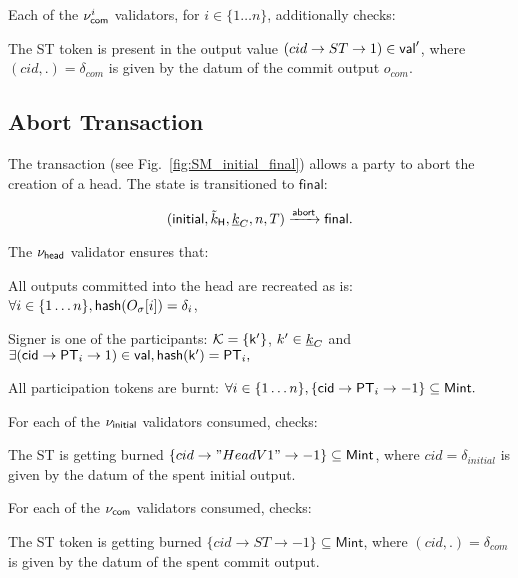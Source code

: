 \noindent Each of the $\nu_\mathsf{com}^i$ validators, for $i \in \{ 1\dots n\}$, additionally checks:
\begin{menumerate}
    \item The ST token is present in the output value $(cid \rightarrow ST \rightarrow 1) \in \mathsf{val}'$, where $(cid,.) = \delta_{com}$ is given by the datum of the commit output $o_{com}$.
\end{menumerate}

\subsection{Abort Transaction}\label{sec:abort-tx} 




The \mtxAbort{} transaction
(see Fig.~\ref{fig:SM_initial_final}) allows a party to abort the
creation of a head.  The state is transitioned to $\mathsf{final}$:

$$
   (\mathsf{initial},\tilde{k}_{\mathsf{H}},\underline{k}_C,n,T) \xrightarrow{\mathsf{abort}} \mathsf{final}.
$$

\noindent The $\nu_\mathsf{head}$ validator ensures that:
\begin{menumerate}
 \item All outputs committed into the head are recreated as is: $\forall i \in \{1\dots n\}, \mathsf{hash}(O_\sigma[i]) = \delta_i$,
  \item Signer is one of the participants: $\mathcal K = \{\mathsf{k'}\}$, $k' \in \underline{k}_C$ and
    $
    \exists (\mathsf{cid} \rightarrow \mathsf{PT}_i \rightarrow 1) \in \mathsf{val}, \mathsf{hash}(\mathsf{k'}) = \mathsf{PT}_i,
    $
 \item All participation tokens are burnt: $\forall i \in \{1\dots n\}, \{\mathsf{cid} \rightarrow \mathsf{PT}_i \rightarrow -1\} \subseteq \mathsf{Mint}.$
\end{menumerate} 

\noindent For each of the $\nu_\mathsf{initial}$ validators consumed, checks:
\begin{menumerate}
  \item The ST is getting burned
  $\{cid \rightarrow "HeadV1" \rightarrow -1\} \subseteq \mathsf{Mint}$, where
  $cid = \delta_{initial}$ is given by the datum of the spent initial output.
\end{menumerate}

\noindent For each of the $\nu_\mathsf{com}$ validators consumed, checks:
\begin{menumerate}
  \item The ST token is getting burned
  $\{cid \rightarrow ST \rightarrow -1\} \subseteq \mathsf{Mint}$, where
  $(cid,.) = \delta_{com}$ is given by the datum of the spent commit output.
\end{menumerate}

